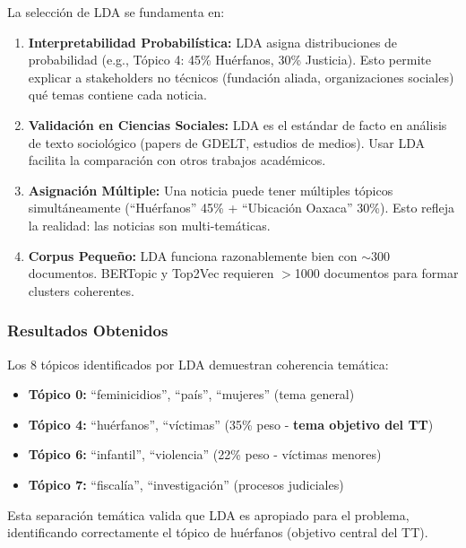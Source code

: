 La selección de LDA se fundamenta en:

\begin{enumerate}
    \item \textbf{Interpretabilidad Probabilística:} LDA asigna distribuciones de probabilidad (e.g., Tópico 4: 45\% Huérfanos, 30\% Justicia). Esto permite explicar a stakeholders no técnicos (fundación aliada, organizaciones sociales) qué temas contiene cada noticia.
    
    \item \textbf{Validación en Ciencias Sociales:} LDA es el estándar de facto en análisis de texto sociológico (papers de GDELT, estudios de medios). Usar LDA facilita la comparación con otros trabajos académicos.
    
    \item \textbf{Asignación Múltiple:} Una noticia puede tener múltiples tópicos simultáneamente (``Huérfanos'' 45\% + ``Ubicación Oaxaca'' 30\%). Esto refleja la realidad: las noticias son multi-temáticas.
    
    \item \textbf{Corpus Pequeño:} LDA funciona razonablemente bien con $\sim$300 documentos. BERTopic y Top2Vec requieren $>$1000 documentos para formar clusters coherentes.
\end{enumerate}

\subsubsection{Resultados Obtenidos}
\label{subsubsec:resultados_lda}

Los 8 tópicos identificados por LDA demuestran coherencia temática:

\begin{itemize}
    \item \textbf{Tópico 0:} ``feminicidios'', ``país'', ``mujeres'' (tema general)
    \item \textbf{Tópico 4:} ``huérfanos'', ``víctimas'' (35\% peso - \textbf{tema objetivo del TT})
    \item \textbf{Tópico 6:} ``infantil'', ``violencia'' (22\% peso - víctimas menores)
    \item \textbf{Tópico 7:} ``fiscalía'', ``investigación'' (procesos judiciales)
\end{itemize}

Esta separación temática valida que LDA es apropiado para el problema, identificando correctamente el tópico de huérfanos (objetivo central del TT).

